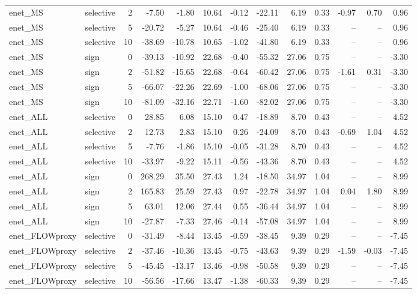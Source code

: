 \begin{tabular}{llrrrrrrrrrrr}
enet_MS & selective & 2 & -7.50 & -1.80 & 10.64 & -0.12 & -22.11 & 6.19 & 0.33 & -0.97 & 0.70 & 0.96 \\
enet_MS & selective & 5 & -20.72 & -5.27 & 10.64 & -0.46 & -25.40 & 6.19 & 0.33 & -- & -- & 0.96 \\
enet_MS & selective & 10 & -38.69 & -10.78 & 10.65 & -1.02 & -41.80 & 6.19 & 0.33 & -- & -- & 0.96 \\
enet_MS & sign & 0 & -39.13 & -10.92 & 22.68 & -0.40 & -55.32 & 27.06 & 0.75 & -- & -- & -3.30 \\
enet_MS & sign & 2 & -51.82 & -15.65 & 22.68 & -0.64 & -60.42 & 27.06 & 0.75 & -1.61 & 0.31 & -3.30 \\
enet_MS & sign & 5 & -66.07 & -22.26 & 22.69 & -1.00 & -68.06 & 27.06 & 0.75 & -- & -- & -3.30 \\
enet_MS & sign & 10 & -81.09 & -32.16 & 22.71 & -1.60 & -82.02 & 27.06 & 0.75 & -- & -- & -3.30 \\
enet_ALL & selective & 0 & 28.85 & 6.08 & 15.10 & 0.47 & -18.89 & 8.70 & 0.43 & -- & -- & 4.52 \\
enet_ALL & selective & 2 & 12.73 & 2.83 & 15.10 & 0.26 & -24.09 & 8.70 & 0.43 & -0.69 & 1.04 & 4.52 \\
enet_ALL & selective & 5 & -7.76 & -1.86 & 15.10 & -0.05 & -31.28 & 8.70 & 0.43 & -- & -- & 4.52 \\
enet_ALL & selective & 10 & -33.97 & -9.22 & 15.11 & -0.56 & -43.36 & 8.70 & 0.43 & -- & -- & 4.52 \\
enet_ALL & sign & 0 & 268.29 & 35.50 & 27.43 & 1.24 & -18.50 & 34.97 & 1.04 & -- & -- & 8.99 \\
enet_ALL & sign & 2 & 165.83 & 25.59 & 27.43 & 0.97 & -22.78 & 34.97 & 1.04 & 0.04 & 1.80 & 8.99 \\
enet_ALL & sign & 5 & 63.01 & 12.06 & 27.44 & 0.55 & -36.44 & 34.97 & 1.04 & -- & -- & 8.99 \\
enet_ALL & sign & 10 & -27.87 & -7.33 & 27.46 & -0.14 & -57.08 & 34.97 & 1.04 & -- & -- & 8.99 \\
enet_FLOWproxy & selective & 0 & -31.49 & -8.44 & 13.45 & -0.59 & -38.45 & 9.39 & 0.29 & -- & -- & -7.45 \\
enet_FLOWproxy & selective & 2 & -37.46 & -10.36 & 13.45 & -0.75 & -43.63 & 9.39 & 0.29 & -1.59 & -0.03 & -7.45 \\
enet_FLOWproxy & selective & 5 & -45.45 & -13.17 & 13.46 & -0.98 & -50.58 & 9.39 & 0.29 & -- & -- & -7.45 \\
enet_FLOWproxy & selective & 10 & -56.56 & -17.66 & 13.47 & -1.38 & -60.33 & 9.39 & 0.29 & -- & -- & -7.45 \\

\end{tabular}
